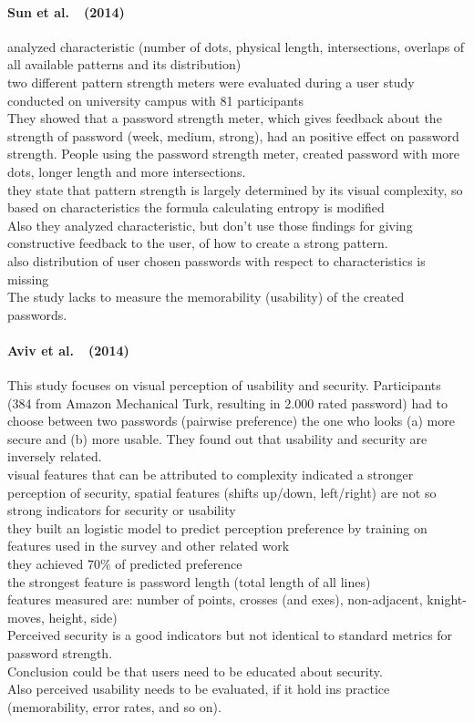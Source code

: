 \documentclass[twocolumn, a4paper, 10pt]{article}
\begin{document}
\paragraph{Sun et al.~\cite{Sun2014308}~(2014)}
analyzed characteristic (number of dots, physical length, intersections, overlaps of all available patterns and its distribution)\\
two different pattern strength meters were evaluated during a user study conducted on university campus with 81 participants\\
They showed that a password strength meter, which gives feedback about the strength of password (week, medium, strong), had an positive effect on password strength. People using the password strength meter, created  password with more dots, longer length and more intersections.\\
they state that pattern strength is largely determined by its visual complexity, so based on characteristics the formula calculating entropy\cite{burr2004electronic} is modified\\
Also they analyzed characteristic, but don't use those findings for giving constructive feedback to the user, of how to create a strong pattern.\\
also distribution of user chosen passwords with respect to characteristics is missing\\
The study lacks to measure the memorability (usability) of the created passwords.

\paragraph{Aviv et al.~\cite{Aviv:2014:UVP:2664243.2664253}~(2014)}
This study focuses on visual perception of usability and security. Participants (384 from Amazon Mechanical Turk, resulting in 2.000 rated password) had to choose between two passwords (pairwise preference) the one who looks (a) more secure and (b) more usable. They found out that usability and security are inversely related.\\
visual features that can be attributed to complexity indicated a stronger perception of security, spatial features (shifts up/down, left/right) are not so strong indicators for security or usability\\
they built an logistic model to predict perception preference by training on features used in the survey and other related work\\
they achieved 70\%  of predicted preference\\
the strongest feature is password length (total length of all lines)\\
features measured are: number of points, crosses (and exes), non-adjacent, knight-moves, height, side)\\
Perceived security is a good indicators but not identical to standard metrics for password strength.\\
Conclusion could be that users need to be educated about security.\\
Also perceived usability needs to be evaluated, if it hold ins practice (memorability, error rates, and so on).
\end{document}
